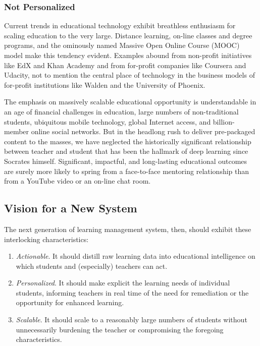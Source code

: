 \documentclass{article}
\begin{document}
\subsubsection{Not Personalized}

Current trends in educational technology
exhibit breathless enthusiasm for scaling education
to the very large.
Distance learning,
on-line classes and degree programs,
and the ominously named Massive Open Online Course (MOOC) model
make this tendency evident.
Examples abound
from non-profit initiatives like EdX and Khan Academy
and from for-profit companies like Coursera and Udacity,
not to mention the central place of technology in the business models of
for-profit institutions like Walden and the University of Phoenix.

The emphasis on massively scalable educational opportunity
is understandable in an age of
financial challenges in education,
large numbers of non-tradi\-tional students,
ubiquitous mobile tech\-nology,
global Internet access,
and billion-member online social networks.
But in the headlong rush to deliver pre-packaged content to the masses,
we have neglected the historically significant relationship
between teacher and student that has been the hallmark
of deep learning since Socrates himself.
Significant, impactful, and long-lasting educational
outcomes are surely more likely to spring
from a face-to-face mentoring relationship than
from a YouTube video or an on-line chat room.

\subsection{Vision for a New System}
\label{sec:future-vision}

The next generation of learning management system, then,
should exhibit these interlocking characteristics:
\begin{enumerate}
\item \emph{Actionable}. It should distill raw learning data
  into educational intelligence on which students
  and (especially) teachers can act.
\item \emph{Personalized}. It should make explicit
  the learning needs of individual students,
  informing teachers in real time of the need for remediation
  or the opportunity for enhanced learning.
\item \emph{Scalable}. It should scale to a reasonably large numbers of students
  without unnecessarily burdening the teacher
  or compromising the foregoing characteristics.
\end{enumerate}
\end{document}

